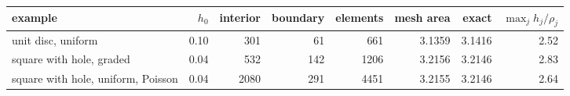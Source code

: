 \begin{tabular}{@{}lrrrrrrr@{}}
\toprule
example & $h_0$ & interior & boundary & elements & mesh area & exact & $\max_j h_j/\rho_j$\\
\midrule
unit disc, uniform & 0.10 & 301 & 61 & 661 & 3.1359 & 3.1416 & 2.52\\
square with hole, graded & 0.04 & 532 & 142 & 1206 & 3.2156 & 3.2146 & 2.83\\
square with hole, uniform, Poisson & 0.04 & 2080 & 291 & 4451 & 3.2155 & 3.2146 & 2.64\\
\bottomrule
\end{tabular}
